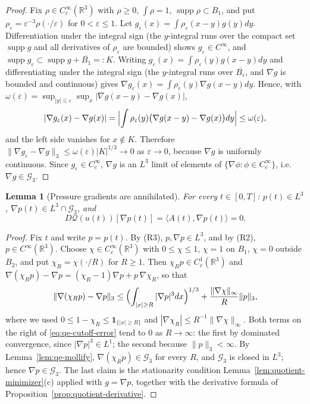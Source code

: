 \documentclass[11pt]{article}
\newtheorem{lemma}[theorem]{Lemma}
\theoremstyle{definition}
\theoremstyle{plain}
\newcommand{\R}{\mathbb R}
\newcommand{\norm}[1]{\lVert #1\rVert}
\begin{document}
\begin{proof}
Fix $\rho\in C_c^\infty(\R^3)$ with $\rho\ge0$, $\int\rho=1$,
$\operatorname{supp}\rho\subset B_1$, and put
$\rho_\varepsilon=\varepsilon^{-3}\rho(\cdot/\varepsilon)$ for
$0<\varepsilon\le1$.  Let $g_\varepsilon(x)=\int\rho_\varepsilon(x-y)g(y)dy$.
Differentiation under the integral sign (the $y$-integral runs over the
compact set $\operatorname{supp}g$ and all derivatives of $\rho_\varepsilon$
are bounded) shows $g_\varepsilon\in C^\infty$, and
$\operatorname{supp}g_\varepsilon\subset\operatorname{supp}g+\overline{B_1}=:K$.
Writing $g_\varepsilon(x)=\int\rho_\varepsilon(y)g(x-y)dy$ and
differentiating under the integral sign (the $y$-integral runs over
$\overline{B_\varepsilon}$, and $\nabla g$ is bounded and continuous) gives
$\nabla g_\varepsilon(x)=\int\rho_\varepsilon(y)\nabla g(x-y)dy$.  Hence, with
$\omega(\varepsilon)=\sup_{|y|\le\varepsilon}\sup_x|\nabla g(x-y)-\nabla g(x)|$,
\[
 |\nabla g_\varepsilon(x)-\nabla g(x)|
 =\Bigl|\int\rho_\varepsilon(y)\bigl(\nabla g(x-y)-\nabla g(x)\bigr)dy\Bigr|
 \le\omega(\varepsilon),
\]
and the left side vanishes for $x\notin K$.  Therefore
$\norm{\nabla g_\varepsilon-\nabla g}_3\le\omega(\varepsilon)|K|^{1/3}\to0$
as $\varepsilon\to0$, because $\nabla g$ is uniformly continuous.  Since
$g_\varepsilon\in C_c^\infty$, $\nabla g$ is an $L^3$ limit of elements of
$\{\nabla\phi:\phi\in C_c^\infty\}$, i.e.\ $\nabla g\in\mathcal G_3$.
\end{proof}

\begin{lemma}[Pressure gradients are annihilated]\label{lem:quotient-pressure}
For every $t\in[0,T]$: $p(t)\in L^3$, $\nabla p(t)\in L^3\cap\mathcal G_3$,
and
\[
 D\mathcal Q(u(t))[\nabla p(t)]=\langle A(t),\nabla p(t)\rangle=0 .
\]
\end{lemma}

\begin{proof}
Fix $t$ and write $p=p(t)$.  By (R3), $p,\nabla p\in L^3$, and by (R2),
$p\in C^\infty(\R^3)$.  Choose $\chi\in C_c^\infty(\R^3)$ with
$0\le\chi\le1$, $\chi=1$ on $B_1$, $\chi=0$ outside $B_2$, and put
$\chi_R=\chi(\cdot/R)$ for $R\ge1$.  Then $\chi_Rp\in C^1_c(\R^3)$ and
$\nabla(\chi_Rp)-\nabla p=(\chi_R-1)\nabla p+p\,\nabla\chi_R$, so that
\begin{equation}\label{eq:qe-cutoff-error}
 \norm{\nabla(\chi_Rp)-\nabla p}_3
 \le\Bigl(\int_{|x|\ge R}|\nabla p|^3dx\Bigr)^{1/3}
 +\frac{\norm{\nabla\chi}_\infty}{R}\norm p_3 ,
\end{equation}
where we used $0\le1-\chi_R\le\mathbf 1_{\{|x|\ge R\}}$ and
$|\nabla\chi_R|\le R^{-1}\norm{\nabla\chi}_\infty$.  Both terms on the
right of \eqref{eq:qe-cutoff-error} tend to $0$ as $R\to\infty$: the first
by dominated convergence, since $|\nabla p|^3\in L^1$; the second because
$\norm p_3<\infty$.  By Lemma~\ref{lem:qe-mollify},
$\nabla(\chi_Rp)\in\mathcal G_3$ for every $R$, and $\mathcal G_3$ is closed
in $L^3$; hence $\nabla p\in\mathcal G_3$.  The last claim is the
stationarity condition Lemma~\ref{lem:quotient-minimizer}(c) applied with
$g=\nabla p$, together with the derivative formula of
Proposition~\ref{prop:quotient-derivative}.
\end{proof}
\end{document}
